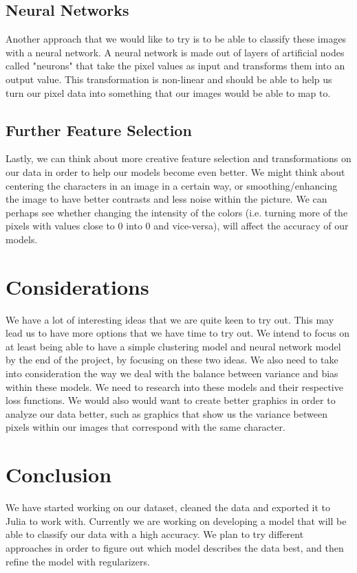 \documentclass[twocolumn]{article}
\begin{document}
    \subsection{Neural Networks}
    Another approach that we would like to try is to be able to classify these images with a neural network. A neural network is made out of layers of artificial nodes called "neurons" that take the pixel values as input and transforms them into an output value. This transformation is non-linear and should be able to help us turn our pixel data into something that our images would be able to map to.
    \subsection{Further Feature Selection}
    Lastly, we can think about more creative feature selection and transformations on our data in order to help our models become even better. We might think about centering the characters in an image in a certain way, or smoothing/enhancing the image to have better contrasts and less noise within the picture. We can perhaps see whether changing the intensity of the colors (i.e. turning more of the pixels with values close to 0 into 0 and vice-versa), will affect the accuracy of our models.
\section{Considerations}
    We have a lot of interesting ideas that we are quite keen to try out. This may lead us to have more options that we have time to try out. We intend to focus on at least being able to have a simple clustering model and neural network model by the end of the project, by focusing on these two ideas. We also need to take into consideration the way we deal with the balance between variance and bias within these models. We need to research into these models and their respective loss functions. We would also would want to create better graphics in order to analyze our data better, such as graphics that show us the variance between pixels within our images that correspond with the same character.
\section{Conclusion}
    We have started working on our dataset, cleaned the data and exported it to Julia to work with. Currently we are working on developing a model that will be able to classify our data with a high accuracy. We plan to try different approaches in order to figure out which model describes the data best, and then refine the model with regularizers.
\end{document}
